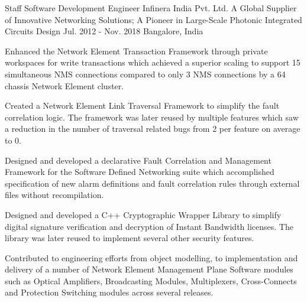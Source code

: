 \begin{cventries}
  \expentry
    {Staff Software Development Engineer} %
    {Infinera India Pvt. Ltd.} %
    {A Global Supplier of Innovative Networking Solutions; A Pioneer in Large-Scale Photonic Integrated Circuits Design} %
    {Jul. 2012 - Nov. 2018} %
    {Bangalore, India} %
    {
      \begin{cvitems} %
      \item {Enhanced the Network Element Transaction Framework through private workspaces for write transactions which achieved a superior scaling to support 15 simultaneous NMS connections compared to only 3 NMS connections by a 64 chassis Network Element cluster.}
      \item {Created a Network Element Link Traversal Framework to simplify the fault correlation logic. The framework was later reused by multiple features which saw a reduction in the number of traversal related bugs from 2 per feature on average to 0.}
      \item {Designed and developed a declarative Fault Correlation and Management Framework for the Software Defined Networking suite which accomplished specification of new alarm definitions and fault correlation rules through external files without recompilation.}
      \item {Designed and developed a C++ Cryptographic Wrapper Library to simplify digital signature verification and decryption of Instant Bandwidth licenses. The library was later reused to implement several other security features.}
      \item {Contributed to engineering efforts from object modelling, to implementation and delivery of a number of Network Element Management Plane Software modules such as Optical Amplifiers, Broadcasting Modules, Multiplexers, Cross-Connects and Protection Switching modules across several releases.}
      \end{cvitems}
    }


\end{cventries}
